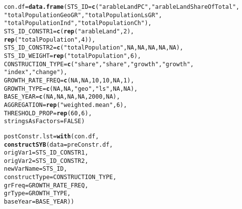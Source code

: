 \documentclass[nojss]{jss}\usepackage[]{graphicx}\usepackage[]{color}
\makeatletter
\newcommand{\hlnum}[1]{\textcolor[rgb]{0.686,0.059,0.569}{#1}}%
\newcommand{\hlstr}[1]{\textcolor[rgb]{0.192,0.494,0.8}{#1}}%
\newcommand{\hlstd}[1]{\textcolor[rgb]{0.345,0.345,0.345}{#1}}%
\newcommand{\hlkwb}[1]{\textcolor[rgb]{0.69,0.353,0.396}{#1}}%
\newcommand{\hlkwc}[1]{\textcolor[rgb]{0.333,0.667,0.333}{#1}}%
\newcommand{\hlkwd}[1]{\textcolor[rgb]{0.737,0.353,0.396}{\textbf{#1}}}%
\newenvironment{kframe}{%
 \def\at@end@of@kframe{}%
 \ifinner\ifhmode%
  \def\at@end@of@kframe{\end{minipage}}%
  \begin{minipage}{\columnwidth}%
 \fi\fi%
 \def\FrameCommand##1{\hskip\@totalleftmargin \hskip-\fboxsep
 \colorbox{shadecolor}{##1}\hskip-\fboxsep
     \hskip-\linewidth \hskip-\@totalleftmargin \hskip\columnwidth}%
 \MakeFramed {\advance\hsize-\width
   \@totalleftmargin\z@ \linewidth\hsize
   \@setminipage}}%
 {\par\unskip\endMakeFramed%
 \at@end@of@kframe}
\newenvironment{knitrout}{}{} %
\makeatother
\begin{document}
\begin{knitrout}
\color{fgcolor}\begin{kframe}
\begin{alltt}
\hlstd{con.df} \hlkwb{=} \hlkwd{data.frame}\hlstd{(}\hlkwc{STS_ID} \hlstd{=} \hlkwd{c}\hlstd{(}\hlstr{"arableLandPC"}\hlstd{,} \hlstr{"arableLandShareOfTotal"}\hlstd{,}
                               \hlstr{"totalPopulationGeoGR"}\hlstd{,} \hlstr{"totalPopulationLsGR"}\hlstd{,}
                               \hlstr{"totalPopulationInd"}\hlstd{,} \hlstr{"totalPopulationCh"}\hlstd{),}
                    \hlkwc{STS_ID_CONSTR1} \hlstd{=} \hlkwd{c}\hlstd{(}\hlkwd{rep}\hlstd{(}\hlstr{"arableLand"}\hlstd{,} \hlnum{2}\hlstd{),}
                                       \hlkwd{rep}\hlstd{(}\hlstr{"totalPopulation"}\hlstd{,} \hlnum{4}\hlstd{)),}
                    \hlkwc{STS_ID_CONSTR2} \hlstd{=} \hlkwd{c}\hlstd{(}\hlstr{"totalPopulation"}\hlstd{,} \hlnum{NA}\hlstd{,} \hlnum{NA}\hlstd{,} \hlnum{NA}\hlstd{,} \hlnum{NA}\hlstd{,} \hlnum{NA}\hlstd{),}
                    \hlkwc{STS_ID_WEIGHT} \hlstd{=} \hlkwd{rep}\hlstd{(}\hlstr{"totalPopulation"}\hlstd{,} \hlnum{6}\hlstd{),}
                    \hlkwc{CONSTRUCTION_TYPE} \hlstd{=} \hlkwd{c}\hlstd{(}\hlstr{"share"}\hlstd{,} \hlstr{"share"}\hlstd{,} \hlstr{"growth"}\hlstd{,} \hlstr{"growth"}\hlstd{,}
                                          \hlstr{"index"}\hlstd{,} \hlstr{"change"}\hlstd{),}
                    \hlkwc{GROWTH_RATE_FREQ} \hlstd{=} \hlkwd{c}\hlstd{(}\hlnum{NA}\hlstd{,} \hlnum{NA}\hlstd{,} \hlnum{10}\hlstd{,} \hlnum{10}\hlstd{,} \hlnum{NA}\hlstd{,} \hlnum{1}\hlstd{),}
                    \hlkwc{GROWTH_TYPE} \hlstd{=} \hlkwd{c}\hlstd{(}\hlnum{NA}\hlstd{,} \hlnum{NA}\hlstd{,} \hlstr{"geo"}\hlstd{,} \hlstr{"ls"}\hlstd{,} \hlnum{NA}\hlstd{,} \hlnum{NA}\hlstd{),}
                    \hlkwc{BASE_YEAR} \hlstd{=} \hlkwd{c}\hlstd{(}\hlnum{NA}\hlstd{,} \hlnum{NA}\hlstd{,} \hlnum{NA}\hlstd{,} \hlnum{NA}\hlstd{,} \hlnum{2000}\hlstd{,} \hlnum{NA}\hlstd{),}
                    \hlkwc{AGGREGATION} \hlstd{=} \hlkwd{rep}\hlstd{(}\hlstr{"weighted.mean"}\hlstd{,} \hlnum{6}\hlstd{),}
                    \hlkwc{THRESHOLD_PROP} \hlstd{=} \hlkwd{rep}\hlstd{(}\hlnum{60}\hlstd{,} \hlnum{6}\hlstd{),}
                    \hlkwc{stringsAsFactors} \hlstd{=} \hlnum{FALSE}\hlstd{)}

\hlstd{postConstr.lst} \hlkwb{=} \hlkwd{with}\hlstd{(con.df,}
                      \hlkwd{constructSYB}\hlstd{(}\hlkwc{data} \hlstd{= preConstr.df,}
                                   \hlkwc{origVar1} \hlstd{= STS_ID_CONSTR1,}
                                   \hlkwc{origVar2} \hlstd{= STS_ID_CONSTR2,}
                                   \hlkwc{newVarName} \hlstd{= STS_ID,}
                                   \hlkwc{constructType} \hlstd{= CONSTRUCTION_TYPE,}
                                   \hlkwc{grFreq} \hlstd{= GROWTH_RATE_FREQ,}
                                   \hlkwc{grType} \hlstd{= GROWTH_TYPE,}
                                   \hlkwc{baseYear} \hlstd{= BASE_YEAR))}
\end{alltt}
\end{kframe}
\end{knitrout}
\end{document}
